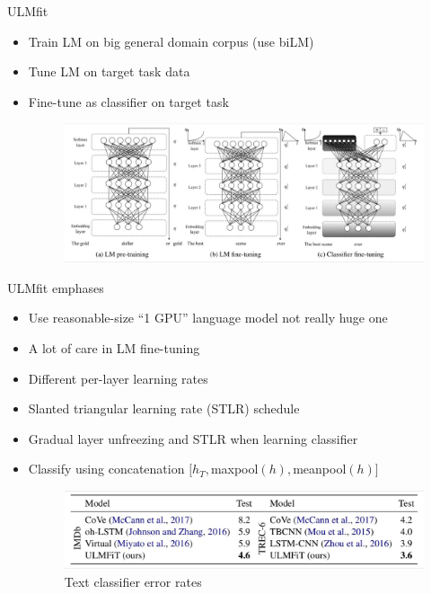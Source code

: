 \documentclass[handout]{beamer}
\begin{document}
\begin{frame}{ULMfit}
\begin{scriptsize}
\begin{itemize}
\item Train LM on big general domain corpus (use biLM)
\item Tune LM on target task data
\item Fine-tune as classifier on target task

\begin{figure}[h]
        	\includegraphics[scale = 0.2]{pics/ulmfit2.png}
        \end{figure}  

\end{itemize}
\end{scriptsize}
\end{frame}


\begin{frame}{ULMfit emphases}
\begin{scriptsize}
\begin{itemize}
\item Use reasonable-size ``1 GPU'' language model not really huge one
\item A lot of care in LM fine-tuning
\item Different per-layer learning rates
\item Slanted triangular learning rate (STLR) schedule
\item Gradual layer unfreezing and STLR when learning classifier
\item Classify using concatenation $[h_T, $maxpool$(h),$meanpool$(h)]$

\begin{figure}[h]
        	\includegraphics[scale = 0.2]{pics/ulmfit3.png}
        	Text classifier error rates
        \end{figure}  

\end{itemize}
\end{scriptsize}
\end{frame}
\end{document}
